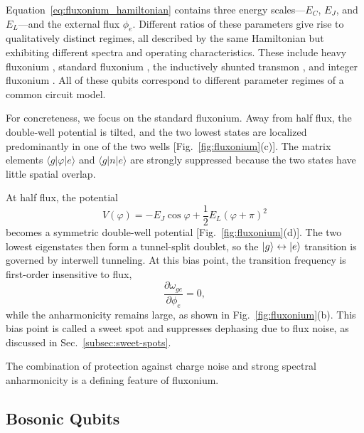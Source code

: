 Equation~\eqref{eq:fluxonium_hamiltonian} contains three energy scales---\(E_C\), \(E_J\), and \(E_L\)---and the external flux \(\phi_e\). Different ratios of these parameters give rise to qualitatively distinct regimes, all described by the same Hamiltonian but exhibiting different spectra and operating characteristics. These include heavy fluxonium \cite{Earnest2018,Zhang2021,Ficheux2021}, standard fluxonium \cite{Nguyen2019,Somoroff2023,Bao2022,Ding2023}, the inductively shunted transmon \cite{Hassani2023,Zobrist2026}, and integer fluxonium \cite{Mencia2024}. All of these qubits correspond to different parameter regimes of a common circuit model.

For concreteness, we focus on the standard fluxonium. Away from half flux, the double-well potential is tilted, and the two lowest states are localized predominantly in one of the two wells [Fig.~\ref{fig:fluxonium}(c)]. The matrix elements \(\langle g|\varphi|e\rangle\) and \(\langle g|n|e\rangle\) are strongly suppressed because the two states have little spatial overlap.

At half flux, the potential
\begin{equation}
    V(\varphi)= -E_J \cos\varphi + \frac{1}{2} E_L (\varphi + \pi)^2
\end{equation}
becomes a symmetric double-well potential [Fig.~\ref{fig:fluxonium}(d)]. The two lowest eigenstates then form a tunnel-split doublet, so the \(\ket{g}\leftrightarrow\ket{e}\) transition is governed by interwell tunneling. At this bias point, the transition frequency is first-order insensitive to flux,
\begin{equation}
    \frac{\partial \omega_{ge}}{\partial \phi_e}=0,
\end{equation}
while the anharmonicity remains large, as shown in Fig.~\ref{fig:fluxonium}(b). This bias point is called a sweet spot and suppresses dephasing due to flux noise, as discussed in Sec.~\ref{subsec:sweet-spots}. 

The combination of protection against charge noise and strong spectral anharmonicity is a defining feature of fluxonium.

\subsection{Bosonic Qubits}
\label{sec:bosonic_qubits}


